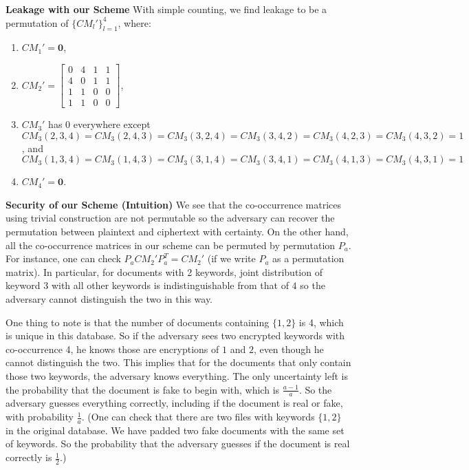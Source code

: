 \documentclass{article}
\newcommand{\cmatrix}{CM}
\begin{document}
\textbf{Leakage with our Scheme} With simple counting, we find leakage to be a permutation  of $\{\cmatrix_l'\}_{l=1}^{4}$, where:
\begin{enumerate}
	\item $\cmatrix_1' = \textbf{0}$,
	
	\item $\cmatrix_2' = 
	\begin{bmatrix}
	0 & 4 & 1 & 1\\ 
	4 & 0 & 1 & 1\\ 
	1 & 1 & 0 & 0\\ 
	1 & 1 & 0 & 0 
	\end{bmatrix}$,
	
	\item $\cmatrix_3'$ has 0 everywhere except $\cmatrix_3(2,3,4) = \cmatrix_3(2,4,3) = \cmatrix_3(3,2,4) = \cmatrix_3(3,4,2) = \cmatrix_3(4,2,3) = \cmatrix_3(4,3,2) = 1$, and $\cmatrix_3(1,3,4) = \cmatrix_3(1,4,3) = \cmatrix_3(3,1,4) = \cmatrix_3(3,4,1) = \cmatrix_3(4,1,3) = \cmatrix_3(4,3,1) = 1$
	
	\item $\cmatrix_4' = \textbf{0}$.
\end{enumerate}


\textbf{Security of our Scheme (Intuition)} We see that the co-occurrence matrices using trivial construction are not permutable so the adversary can recover the permutation between plaintext and ciphertext with certainty. On the other hand, all the co-occurrence matrices in our scheme can be permuted by permutation $P_a$. For instance, one can check $P_a \cmatrix_2' P_a^{T} = \cmatrix_2'$ (if we write $P_a$ as a permutation matrix). In particular, for documents with 2 keywords, joint distribution of keyword $3$ with all other keywords is indistinguishable from that of $4$ so the adversary cannot distinguish the two in this way. 

One thing to note is that the number of documents containing $\{1,2\}$ is 4, which is unique in this database. So if the adversary sees two encrypted keywords with co-occurrence 4, he knows those are encryptions of $1$ and $2$, even though he cannot distinguish the two. This implies that for the documents that only contain those two keywords, the adversary knows everything. The only uncertainty left is the probability that the document is fake to begin with, which is $\frac{a-1}{a}$. So the adversary guesses everything correctly, including if the document is real or fake, with probability $\frac{1}{a}$. (One can check that there are two files with keywords $\{1,2\}$ in the original database. We have padded two fake documents with the same set of keywords. So the probability that the adversary guesses if the document is real correctly is $\frac{1}{2}$.)
\end{document}
